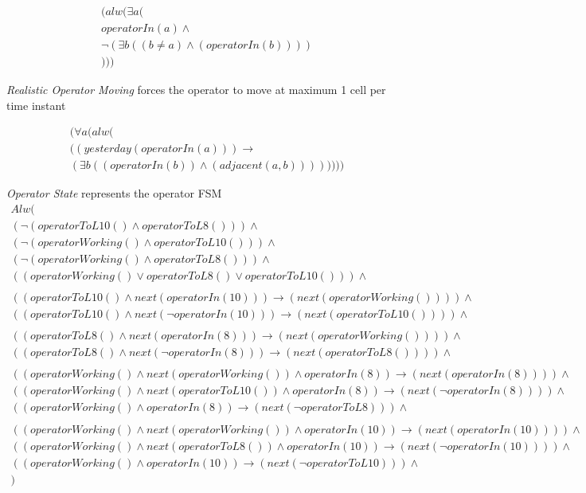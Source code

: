 \begin{align*}
	(alw(\exists a (\\
	operatorIn(a)\land\\
	\neg(\exists b ((b\neq a)\land(operatorIn(b))))\\
	)))
\end{align*}


\textit{Realistic Operator Moving} forces the operator to move at maximum 1 cell per time instant

\begin{align*}
	(\forall a (alw(\\
	((yesterday(operatorIn(a)))\longrightarrow\\
	(\exists b ((operatorIn(b))\land(adjacent(a,b)))) )
	)))
\end{align*}


\textit{Operator State} represents the operator FSM
\begin{align*}
	Alw(\\
	(\neg(operatorToL10()\land operatorToL8())) \land\\
	(\neg(operatorWorking()\land operatorToL10())) \land\\
	(\neg(operatorWorking()\land operatorToL8())) \land\\
	((operatorWorking()\lor operatorToL8()\lor operatorToL10())) \land\\
	\\
	((operatorToL10()\land next(operatorIn(10)))\longrightarrow(next(operatorWorking())))\land\\
	((operatorToL10()\land next(\neg operatorIn(10)))\longrightarrow(next(operatorToL10())))\land\\
	\\
	((operatorToL8()\land next(operatorIn(8)))\longrightarrow(next(operatorWorking())))\land\\
	((operatorToL8()\land next(\neg operatorIn(8)))\longrightarrow(next(operatorToL8())))\land\\
	\\
	((operatorWorking()\land next(operatorWorking())\land operatorIn(8))\longrightarrow(next(operatorIn(8))))\land\\
	((operatorWorking()\land next(operatorToL10())\land operatorIn(8))\longrightarrow(next(\neg operatorIn(8))))\land\\
	((operatorWorking()\land operatorIn(8))\longrightarrow(next(\neg operatorToL8)))\land\\
	\\
	((operatorWorking()\land next(operatorWorking())\land operatorIn(10))\longrightarrow(next(operatorIn(10))))\land\\
	((operatorWorking()\land next(operatorToL8())\land operatorIn(10))\longrightarrow(next(\neg operatorIn(10))))\land\\
	((operatorWorking()\land operatorIn(10))\longrightarrow(next(\neg operatorToL10)))\land\\
	)
\end{align*}



